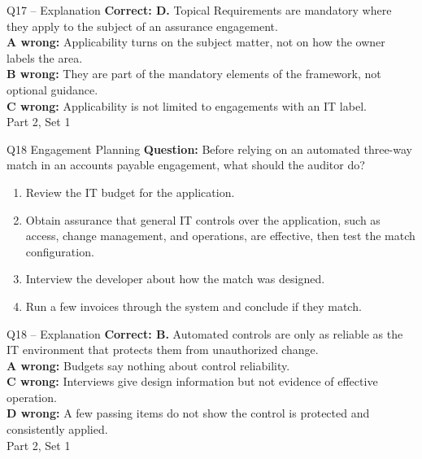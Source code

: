 \documentclass[aspectratio=169,10pt]{beamer}
\begin{document}
\begin{frame}[t]{Q17 -- Explanation}
	\footnotesize
	\textbf{Correct: D.} Topical Requirements are mandatory where they apply to the subject of an assurance engagement. \\[5pt]
\textbf{A wrong:} Applicability turns on the subject matter, not on how the owner labels the area. \\[3pt]
\textbf{B wrong:} They are part of the mandatory elements of the framework, not optional guidance. \\[3pt]
\textbf{C wrong:} Applicability is not limited to engagements with an IT label. \\[3pt]
	\vfill {\tiny Part 2, Set 1}
\end{frame}
\begin{frame}[t]{Q18 \hfill {\scriptsize Engagement Planning}}
	\small
	\textbf{Question:} Before relying on an automated three-way match in an accounts payable engagement, what should the auditor do?
	\begin{enumerate}[label=\Alph*.,itemsep=1pt,topsep=3pt]
			\item Review the IT budget for the application.
			\item Obtain assurance that general IT controls over the application, such as access, change management, and operations, are effective, then test the match configuration.
			\item Interview the developer about how the match was designed.
			\item Run a few invoices through the system and conclude if they match.
	\end{enumerate}
\end{frame}
\begin{frame}[t]{Q18 -- Explanation}
	\footnotesize
	\textbf{Correct: B.} Automated controls are only as reliable as the IT environment that protects them from unauthorized change. \\[5pt]
\textbf{A wrong:} Budgets say nothing about control reliability. \\[3pt]
\textbf{C wrong:} Interviews give design information but not evidence of effective operation. \\[3pt]
\textbf{D wrong:} A few passing items do not show the control is protected and consistently applied. \\[3pt]
	\vfill {\tiny Part 2, Set 1}
\end{frame}
\end{document}
